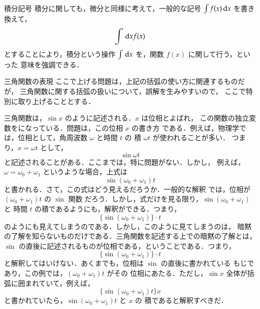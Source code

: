 \begin{preattention}{積分記号}
        積分に関しても，微分と同様に考えて，一般的な記号 $\int f(x) \,\mathrm{d} x$ を書き換えて，
            \begin{align*}
                \int \,\mathrm{d} x f(x)
            \end{align*}
        とすることにより，積分という操作 $\int \,\mathrm{d} x$ を，関数 $f(x)$ に関して行う，といった
        意味を強調できる．
    \end{preattention}

    \begin{preattention}{三角関数の表現}
        ここで上げる問題は，上記の括弧の使い方に関連するものだが，
        三角関数に関する括弧の扱いについて，誤解を生みやすいので，
        ここで特別に取り上げることとする．

        三角関数は，$\sin x$ のように記述される．$x$ は位相とよばれ，
        この関数の独立変数をになっている．問題は，この位相 $x$ の書き方
        である．例えば，物理学では，位相として，角周波数 $\omega$ と時間 $t$ の
        積 $\omega t$ が使われることが多い．
        つまり，$x=\omega t$ として，
            \begin{equation*}
                \sin \omega t
            \end{equation*}
        と記述されることがある．ここまでは，特に問題がない．しかし，
        例えば，$\omega=\omega_{0}+\omega_{1}$ というような場合，上式は
            \begin{equation*}
                \sin \left(\omega_{0}+\omega_{1}\right) t
            \end{equation*}
        と書かれる．さて，この式はどう見えるだろうか．一般的な解釈
        では，位相が $\left(\omega_{0}+\omega_{1}\right) t$ の $\sin$ 関数
        だろう．しかし，式だけを見る限り，$\sin \left(\omega_{0}+\omega_{1}\right)$ と
        時間 $t$ の積であるようにも，解釈ができる．つまり，
            \begin{equation*}
                \{\sin \left(\omega_{0}+\omega_{1}\right)\}\cdot t
            \end{equation*}
        のようにも見えてしまうのである．しかし，このように見てしまうのは，
        暗黙の了解を知らないものだけである．三角関数を記述する上での暗黙の了解とは，
        $\sin$ の直後に記述されるものが位相である，ということである．つまり，
            \begin{equation*}
                \{\sin \left(\omega_{0}+\omega_{1}\right)\}\cdot t
            \end{equation*}
        と解釈してはいけない．あくまでも，位相は $\sin$ の直後に書かれている
        もじであり，この例では，$\left(\omega_{0}+\omega_{1}\right) t$ がその
        位相にあたる．ただし，$\sin x$ 全体が括弧に囲まれていて，例えば，
            \begin{equation*}
                \{\sin \left(\omega_{0}+\omega_{1}\right) t\}x
            \end{equation*}
        と書かれていたら，$\sin \left(\omega_{0}+\omega_{1}\right) t$ と $x$ の
        積であると解釈すべきだ．


\end{preattention}
